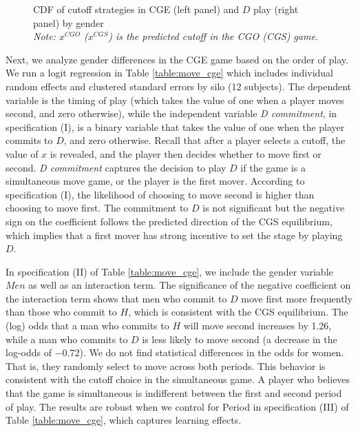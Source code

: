 \documentclass[12pt, letterpaper]{article}
\theoremstyle{plain}
\begin{document}
\begin{center}
\begin{figure}[ht]
\begin{minipage}[t]{0.45\columnwidth}
\end{minipage} 
\caption{CDF of cutoff strategies in CGE (left panel) and $D$ play (right panel) by gender\\ \footnotesize{\textit{Note: $x^{CGO}$ ($x^{CGS}$) is the predicted cutoff in the CGO (CGS) game.}}}
\label{fig:cdfgender2}\end{figure}
\par\end{center}

Next, we analyze gender differences in the CGE game based on the order of play. We run a logit regression in Table \ref{table:move_cge} which includes individual random effects and clustered standard errors by silo (12 subjects). The dependent variable is the timing of play (which takes the value of one when a player moves second, and zero otherwise), while the independent variable \textit{D commitment}, in specification (I), is a binary variable that takes the value of one when the player commits to $D$, and zero otherwise. Recall that after a player selects a cutoff, the value of $x$ is revealed, and the player then decides whether to move first or second. \textit{D commitment} captures the decision to play $D$ if the game is a simultaneous move game, or the player is the first mover. According to specification (I), the likelihood of choosing to move second is higher than choosing to move first. The commitment to $D$ is not significant but the negative sign on the coefficient follows the predicted direction of the CGS equilibrium, which implies that a first mover has strong incentive to set the stage by playing $D$. 

In specification (II) of Table \ref{table:move_cge}, we include the gender variable $Men$ as well as an interaction term. The significance of the negative coefficient on the interaction term shows that men who commit to $D$ move first more frequently than those who commit to $H$, which is consistent with the CGS equilibrium. The (log) odds that a man who commits to $H$ will move second increases by 1.26, while a man who commits to $D$ is less likely to move second (a decrease in the log-odds of  $-0.72$). We do not find statistical differences in the odds for women. That is, they randomly select to move across both periods. This behavior is consistent with the cutoff choice in the simultaneous game. A player who believes that the game is simultaneous is indifferent between the first and second period of play. The results are robust when we control for Period in specification (III) of Table \ref{table:move_cge}, which captures learning effects. 
\end{document}
